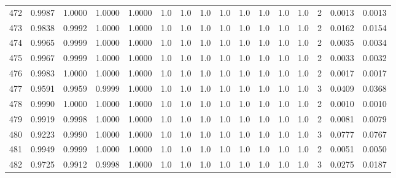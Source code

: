 \begin{tabular}{lrrrrrrrrrrrrrrr}
472 &      0.9987 &  1.0000 &  1.0000 &  1.0000 &     1.0 &     1.0 &     1.0 &     1.0 &     1.0 &     1.0 &      1.0 &        1.0 &      2 &                    0.0013 &                     0.0013 \\
473 &      0.9838 &  0.9992 &  1.0000 &  1.0000 &     1.0 &     1.0 &     1.0 &     1.0 &     1.0 &     1.0 &      1.0 &        1.0 &      2 &                    0.0162 &                     0.0154 \\
474 &      0.9965 &  0.9999 &  1.0000 &  1.0000 &     1.0 &     1.0 &     1.0 &     1.0 &     1.0 &     1.0 &      1.0 &        1.0 &      2 &                    0.0035 &                     0.0034 \\
475 &      0.9967 &  0.9999 &  1.0000 &  1.0000 &     1.0 &     1.0 &     1.0 &     1.0 &     1.0 &     1.0 &      1.0 &        1.0 &      2 &                    0.0033 &                     0.0032 \\
476 &      0.9983 &  1.0000 &  1.0000 &  1.0000 &     1.0 &     1.0 &     1.0 &     1.0 &     1.0 &     1.0 &      1.0 &        1.0 &      2 &                    0.0017 &                     0.0017 \\
477 &      0.9591 &  0.9959 &  0.9999 &  1.0000 &     1.0 &     1.0 &     1.0 &     1.0 &     1.0 &     1.0 &      1.0 &        1.0 &      3 &                    0.0409 &                     0.0368 \\
478 &      0.9990 &  1.0000 &  1.0000 &  1.0000 &     1.0 &     1.0 &     1.0 &     1.0 &     1.0 &     1.0 &      1.0 &        1.0 &      2 &                    0.0010 &                     0.0010 \\
479 &      0.9919 &  0.9998 &  1.0000 &  1.0000 &     1.0 &     1.0 &     1.0 &     1.0 &     1.0 &     1.0 &      1.0 &        1.0 &      2 &                    0.0081 &                     0.0079 \\
480 &      0.9223 &  0.9990 &  1.0000 &  1.0000 &     1.0 &     1.0 &     1.0 &     1.0 &     1.0 &     1.0 &      1.0 &        1.0 &      3 &                    0.0777 &                     0.0767 \\
481 &      0.9949 &  0.9999 &  1.0000 &  1.0000 &     1.0 &     1.0 &     1.0 &     1.0 &     1.0 &     1.0 &      1.0 &        1.0 &      2 &                    0.0051 &                     0.0050 \\
482 &      0.9725 &  0.9912 &  0.9998 &  1.0000 &     1.0 &     1.0 &     1.0 &     1.0 &     1.0 &     1.0 &      1.0 &        1.0 &      3 &                    0.0275 &                     0.0187 \\

\end{tabular}
